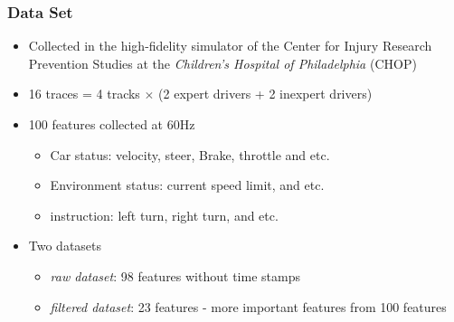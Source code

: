 \documentclass{beamer}
\begin{document}
\begin{frame}
\frametitle{Data Set}
\begin{itemize}
\item Collected in the high-fidelity simulator of the Center for Injury Research Prevention Studies at the \textit{Children's Hospital of Philadelphia} (CHOP)
\item 16 traces = 4 tracks $\times$ (2 expert drivers + 2 inexpert drivers)
\item 100 features collected at 60Hz
	\begin{itemize}
	\item Car status: velocity, steer, Brake, throttle and etc.
	\item Environment status: current speed limit, and etc.
	\item instruction: left turn, right turn, and etc.
	\end{itemize}
\item Two datasets
	\begin{itemize}
	\item {\em raw dataset}: 98 features without time stamps
	\item {\em filtered dataset}: 23 features - more important features from 100 features
	\end{itemize}
\end{itemize}

\end{frame}
\end{document}
